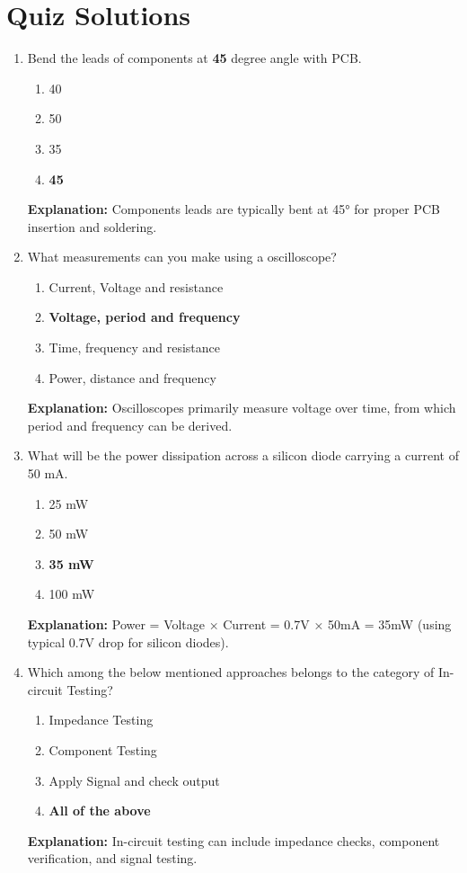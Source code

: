 \documentclass[a4paper,12pt]{article}
\begin{document}
	
	\section*{Quiz Solutions}
	
	\begin{enumerate}
		\item Bend the leads of components at \textbf{45} degree angle with PCB.
		\begin{enumerate}
			\item 40
			\item 50
			\item 35
			\item \textbf{45}
		\end{enumerate}
		\textbf{Explanation:} Components leads are typically bent at 45° for proper PCB insertion and soldering.
		
		\item What measurements can you make using a oscilloscope?
		\begin{enumerate}
			\item Current, Voltage and resistance
			\item \textbf{Voltage, period and frequency}
			\item Time, frequency and resistance
			\item Power, distance and frequency
		\end{enumerate}
		\textbf{Explanation:} Oscilloscopes primarily measure voltage over time, from which period and frequency can be derived.
		
		\item What will be the power dissipation across a silicon diode carrying a current of 50 mA.
		\begin{enumerate}
			\item 25 mW
			\item 50 mW
			\item \textbf{35 mW}
			\item 100 mW
		\end{enumerate}
		\textbf{Explanation:} Power = Voltage × Current = 0.7V × 50mA = 35mW (using typical 0.7V drop for silicon diodes).
		
		\item Which among the below mentioned approaches belongs to the category of In-circuit Testing?
		\begin{enumerate}
			\item Impedance Testing
			\item Component Testing
			\item Apply Signal and check output
			\item \textbf{All of the above}
		\end{enumerate}
		\textbf{Explanation:} In-circuit testing can include impedance checks, component verification, and signal testing.
		

\end{enumerate}
\end{document}
